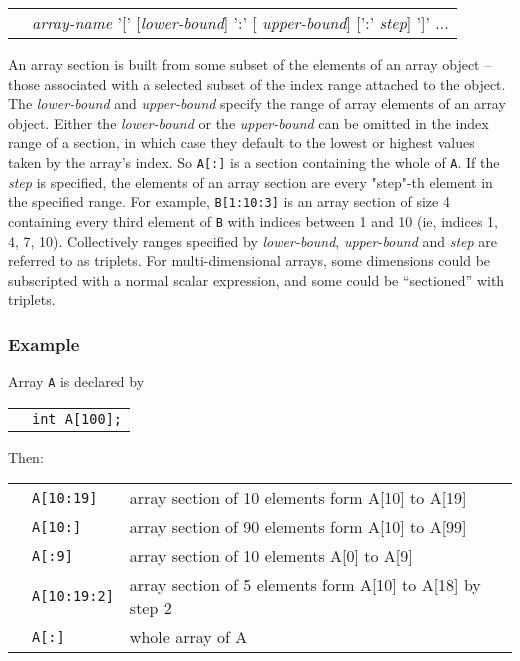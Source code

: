 \begin{tabular}{ll}
\hspace{0.5cm} & {\it array-name} '[' [{\it lower-bound}] ':' [{\it
  upper-bound}] [':' {\it step}] ']' ...
\end{tabular}

An array section is built from some subset of the elements of an array
object -- those associated with a selected subset of the index range
attached to the object. The {\it lower-bound} and {\it upper-bound}
specify the range of array elements of an array object. Either the
{\it lower-bound} or the {\it upper-bound} can be omitted in the index
range of a section, in which case they default to the lowest or
highest values taken by the array's index. So {\tt A[:]} is a section
containing the whole of {\tt A}. If the {\it step} is specified,  
the elements of an array section are every "step"-th element in the
specified range. For example, {\tt B[1:10:3]} is an array section of
size 4 containing every third element of {\tt B} with indices between
1 and 10 (ie, indices 1, 4, 7, 10). Collectively ranges specified by
{\it lower-bound}, {\it upper-bound} and {\it step} are referred to as
triplets. For multi-dimensional arrays, some dimensions could be
subscripted with a normal scalar expression, and some could be
``sectioned'' with triplets.  

\subsubsection*{Example}

Array {\tt A} is declared by

\begin{tabular}{ll}
\hspace{0.5cm} & {\tt int A[100];} \\
\end{tabular}

Then:

\begin{tabular}{lll}
\hspace{0.5cm} & {\tt A[10:19]} & array section of 10 elements form A[10] to
A[19] \\
 & {\tt A[10:]} & array section of 90 elements form A[10] to A[99] \\
 & {\tt A[:9]} & array section of 10 elements A[0] to A[9] \\
 & {\tt A[10:19:2]} & array section of 5 elements form A[10] to A[18]
 by step 2 \\
 & {\tt A[:]} & whole array of A \\
\end{tabular}

